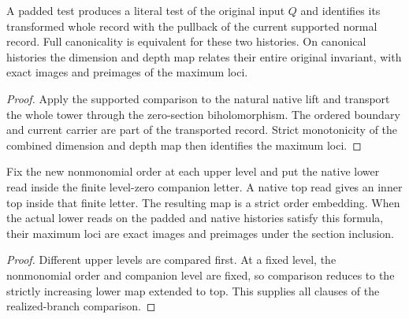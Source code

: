 \begin{theorem}
\label{hir:g1-literal-supported-general-history}
\leanok
A padded test produces a literal test of the original input $Q$ and
identifies its transformed whole record with the pullback of the current
supported normal record. Full canonicality is equivalent for these
two histories. On canonical histories the dimension and depth map
relates their entire original invariant, with exact images and
preimages of the maximum loci.
\end{theorem}
\begin{proof}
Apply the supported comparison to the natural native lift and
transport the whole tower through the zero-section biholomorphism.
The ordered boundary and current carrier are part of the transported
record. Strict monotonicity of the combined dimension and depth map
then identifies the maximum loci.
\end{proof}

\begin{theorem}
\label{hir:g1-normal-nested-order-map}
\leanok
Fix the new nonmonomial order at each upper level and put the native
lower read inside the finite level-zero companion letter. A native
top read gives an inner top inside that finite letter. The resulting
map is a strict order embedding. When the actual lower reads on the
padded and native histories satisfy this formula, their maximum loci
are exact images and preimages under the section inclusion.
\end{theorem}
\begin{proof}
Different upper levels are compared first. At a fixed level, the
nonmonomial order and companion level are fixed, so comparison
reduces to the strictly increasing lower map extended to top. This
supplies all clauses of the realized-branch comparison.
\end{proof}

